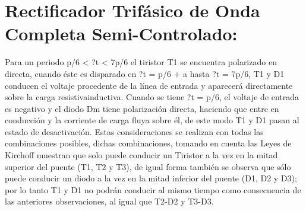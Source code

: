 \documentclass[11pt,a4paper]{article}
\begin{document}
\section{Rectificador Trifásico de Onda Completa Semi-Controlado:}
Para un periodo p/6 < ?t < 7p/6 el tiristor T1 se encuentra polarizado en directa, cuando
éste es disparado en ?t = p/6 + a hasta ?t = 7p/6, T1 y D1 conducen el voltaje
procedente de la línea de entrada y aparecerá directamente sobre la carga resistivainductiva.
Cuando se tiene ?t = p/6, el voltaje de entrada es negativo y el diodo Dm tiene
polarización directa, haciendo que entre en conducción y la corriente de carga fluya sobre
él, de este modo T1 y D1 pasan al estado de desactivación.
Estas consideraciones se realizan con todas las combinaciones posibles, dichas
combinaciones, tomando en cuenta las Leyes de Kirchoff muestran que solo puede
conducir un Tiristor a la vez en la mitad superior del puente (T1, T2 y T3), de igual forma
también se observa que sólo puede conducir un diodo a la vez en la mitad inferior del
puente (D1, D2 y D3); por lo tanto T1 y D1 no podrán conducir al mismo tiempo como
consecuencia de las anteriores observaciones, al igual que T2-D2 y T3-D3.
\end{document}
